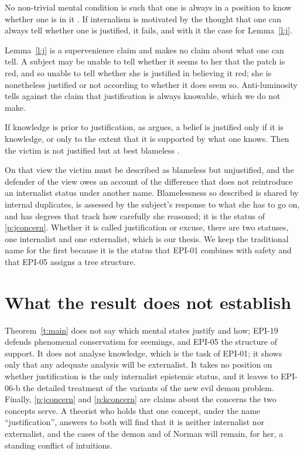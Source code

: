 \documentclass{situationist-preprint}
\begin{document}
\begin{objection}
No non-trivial mental condition is such that one is always in a position to know whether one is in it \citep{Williamson2000}. If internalism is motivated by the thought that one can always tell whether one is justified, it fails, and with it the case for Lemma~\ref{l:j}.
\end{objection}

\begin{reply}
Lemma~\ref{l:j} is a supervenience claim and makes no claim about what one can tell. A subject may be unable to tell whether it seems to her that the patch is red, and so unable to tell whether she is justified in believing it red; she is nonetheless justified or not according to whether it does seem so. Anti-luminosity tells against the claim that justification is always knowable, which we do not make.
\end{reply}

\begin{objection}
If knowledge is prior to justification, as \citet{Williamson2000} argues, a belief is justified only if it is knowledge, or only to the extent that it is supported by what one knows. Then the victim is not justified but at best blameless \citep{Sutton2007,Littlejohn2012}.
\end{objection}

\begin{reply}
On that view the victim must be described as blameless but unjustified, and the defender of the view owes an account of the difference that does not reintroduce an internalist status under another name. Blamelessness so described is shared by internal duplicates, is assessed by the subject's response to what she has to go on, and has degrees that track how carefully she reasoned; it is the status of \ref{p:jconcern}. Whether it is called justification or excuse, there are two statuses, one internalist and one externalist, which is our thesis. We keep the traditional name for the first because it is the status that EPI-01 combines with safety and that EPI-05 assigns a tree structure.
\end{reply}

\section{What the result does not establish}

Theorem~\ref{t:main} does not say which mental states justify and how; EPI-19 defends phenomenal conservatism for seemings, and EPI-05 the structure of support. It does not analyse knowledge, which is the task of EPI-01; it shows only that any adequate analysis will be externalist. It takes no position on whether justification is the only internalist epistemic status, and it leaves to EPI-06-b the detailed treatment of the variants of the new evil demon problem. Finally, \ref{p:jconcern} and \ref{p:kconcern} are claims about the concerns the two concepts serve. A theorist who holds that one concept, under the name \enquote{justification}, answers to both will find that it is neither internalist nor externalist, and the cases of the demon and of Norman will remain, for her, a standing conflict of intuitions.
\end{document}
